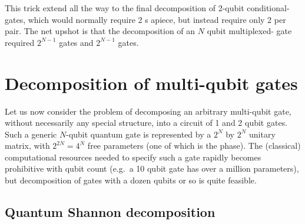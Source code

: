This trick extend all the way to the final decomposition of 2-qubit conditional- gates, which would normally require 2 s apiece, but instead require only 2 per pair. The net upshot is that the decomposition of an $N$ qubit multiplexed- gate required $2^{N-1}$  gates and $2^{N-1}$  gates.









\clearpage
\section{Decomposition of multi-qubit gates}

Let us now consider the problem of decomposing an arbitrary multi-qubit gate, without necessarily any special structure, into a circuit of 1 and 2 qubit gates.  
Such a generic $N$-qubit quantum gate is represented by a $2^N$ by $2^N$ unitary matrix, with $2^{2N}=4^N$ free parameters (one of which is the phase).  The (classical) computational resources needed to specify such a gate rapidly becomes prohibitive with qubit count (e.g.~a 10 qubit gate has over a million parameters), but decomposition of gates with a dozen qubits or so is quite feasible.
 




\subsection{Quantum Shannon decomposition}
\newcommand{\bigzero}{\mbox{\normalfont\Large 0}}

